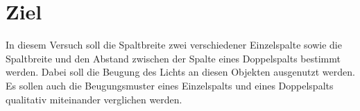 \section{Ziel}
\label{sec:Ziel}
In diesem Versuch soll die Spaltbreite zwei verschiedener Einzelspalte sowie die
Spaltbreite und den Abstand zwischen der Spalte eines Doppelspalts bestimmt werden.
Dabei soll die Beugung des Lichts an diesen Objekten ausgenutzt werden.
Es sollen auch die Beugungsmuster eines Einzelspalts und eines Doppelspalts
qualitativ miteinander verglichen werden.
